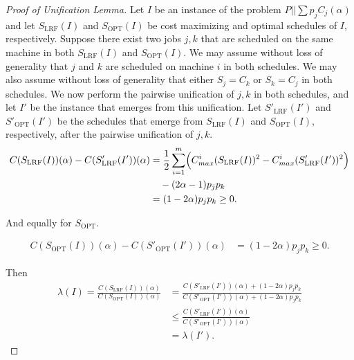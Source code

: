 \documentclass[11pt]{article}
\newcommand{\LRF}{\mathrm{LRF}}
\newcommand{\OPT}{\mathrm{OPT}}
\begin{document}
\begin{proof}[Proof of Unification Lemma]
    Let $I$ be an instance of the problem $P||\sum p_jC_j(\alpha)$ and let $S_{\LRF}(I)$ and $S_{\OPT}(I)$ be cost maximizing and optimal schedules of $I$, respectively.
    Suppose there exist two jobs $j,k$ that are scheduled on the same machine in both $S_{\LRF}(I)$ and $S_{\OPT}(I)$.
    We may assume without loss of generality that $j$ and $k$ are scheduled on machine $i$ in both schedules. 
    We may also assume without loss of generality that either $S_{j} = C_{k}$ or $S_{k} = C_{j}$ in both schedules.
    We now perform the pairwise unification of $j,k$ in both schedules, and let $I'$ be the instance that emerges from this unification. 
    Let $S'_{\LRF}(I')$ and $S'_{\OPT}(I')$ be the schedules that emerge from $S_{\LRF}(I)$ and $S_{\OPT}(I)$, respectively, after the pairwise unification of $j,k$.
    \begin{align*}
        C(S_{\LRF}(I))(\alpha) - C(S'_{\LRF}(I'))(\alpha)
        &= \frac12 \sum_{i=1}^{m}
        \Bigl(
            C^{i}_{max}(S_{\LRF}(I))^2
            - C^{i}_{max}(S'_{\LRF}(I'))^2
        \Bigr) \\
        &\quad -(2\alpha-1)p_jp_k \\
        &= (1-2\alpha)p_jp_k \ge 0.
    \end{align*}

    And equally for $S_{\OPT}$.

    \begin{align*}
        C(S_{\OPT}(I))(\alpha) - C(S'_{\OPT}(I'))(\alpha)
        &= (1-2\alpha)p_jp_k \ge 0.
    \end{align*}

    Then 
    \begin{align*}
        \lambda(I) = \frac{C(S_{\LRF}(I))(\alpha)}{C(S_{\OPT}(I))(\alpha)}
        &= \frac{C(S'_{\LRF}(I'))(\alpha) + (1-2\alpha)p_jp_k}{C(S'_{\OPT}(I'))(\alpha)+ (1-2\alpha)p_jp_k } \\
        &\le \frac{C(S'_{\LRF}(I'))(\alpha)}{C(S'_{\OPT}(I'))(\alpha)} \\
        &= \lambda(I').
    \end{align*}
    
\end{proof}
\end{document}

